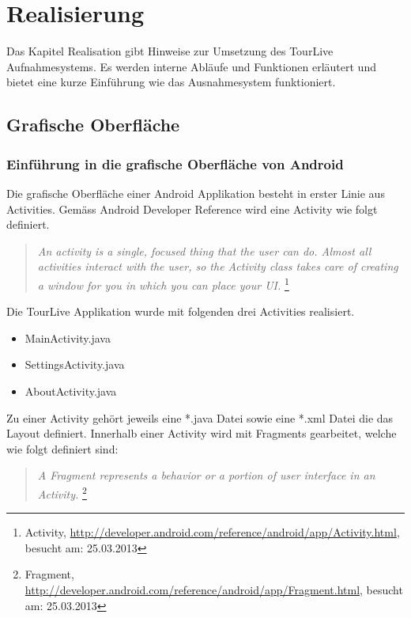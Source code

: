 \section{Realisierung}
Das Kapitel Realisation gibt Hinweise zur Umsetzung des TourLive Aufnahmesystems. Es werden interne Abläufe und Funktionen erläutert und bietet eine kurze Einführung wie das Ausnahmesystem funktioniert. 

\subsection{Grafische Oberfläche}
\subsubsection{Einführung in die grafische Oberfläche von Android}

Die grafische Oberfläche einer Android Applikation besteht in erster Linie aus Activities. Gemäss Android Developer Reference wird eine Activity wie folgt definiert.

\begin{quotation}
\textit{An activity is a single, focused thing that the user can do. Almost all activities interact with the user, so the Activity class takes care of creating a window for you in which you can place your UI.} \footnote{Activity, \url{http://developer.android.com/reference/android/app/Activity.html}, besucht am: 25.03.2013}
\end{quotation}

Die TourLive Applikation wurde mit folgenden drei Activities realisiert.
\begin{itemize} [noitemsep,topsep=0pt]
	\item MainActivity.java
	\item SettingsActivity.java
	\item AboutActivity.java
\end{itemize}

Zu einer Activity gehört jeweils eine *.java Datei sowie eine *.xml Datei die das Layout definiert. Innerhalb einer Activity wird mit Fragments gearbeitet, welche wie folgt definiert sind:

\begin{quotation}
\textit{A Fragment represents a behavior or a portion of user interface in an Activity.} \footnote{Fragment, \url{http://developer.android.com/reference/android/app/Fragment.html}, besucht am: 25.03.2013}
\end{quotation}

